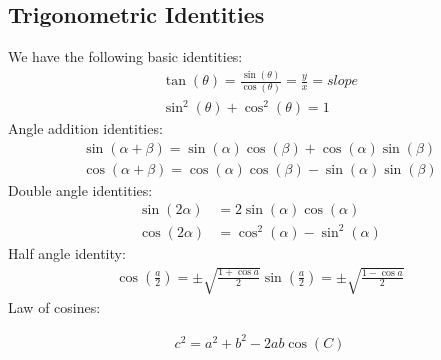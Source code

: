 \documentclass[12pt]{report}
\begin{document}
	\subsection{Trigonometric Identities}
	
	We have the following basic identities:
	\begin{align*}
	\tan(\theta) = \frac{\sin(\theta)}{\cos(\theta)} = \frac{y}{x} = slope \\
	\sin^2(\theta) + \cos^2(\theta) = 1
	\end{align*}
	Angle addition identities:
	\begin{align*}
	\sin(\alpha + \beta) = \sin(\alpha)\cos (\beta) + \cos(\alpha)\sin(\beta) \\
	\cos(\alpha + \beta) = \cos(\alpha)\cos (\beta) - \sin(\alpha)\sin(\beta)
	\end{align*}
	Double angle identities:
	\begin{align*}
	\sin(2\alpha) &= 2\sin(\alpha)\cos (\alpha) \\
	\cos(2\alpha) &= \cos^2(\alpha)- \sin^2(\alpha)
	\end{align*}
	Half angle identity:
	\begin{align*}
	\cos\left(\frac{a}{2}\right) = \pm \sqrt{\frac{1 + \cos{a}}{2}}
	\sin\left(\frac{a}{2}\right) = \pm \sqrt{\frac{1 - \cos{a}}{2}}
	\end{align*}
	Law of cosines:
	
	\begin{align*}
	c^2 = a^2 + b^2 -2ab\cos(C)
	\end{align*}
\end{document}
